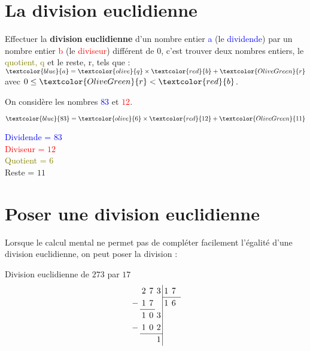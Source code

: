 \begin{pageCours} 

\section{La division euclidienne}

\begin{Def}
Effectuer la \textbf{division euclidienne} d'un nombre entier \textcolor{blue}{a} (le \textcolor{blue}{dividende}) par un nombre entier \textcolor{red}{b} (le \textcolor{red}{diviseur}) différent de 0, c'est trouver deux nombres entiers, le \textcolor{olive}{quotient, q} et le \textcolor{OliveGreen}{reste, r}, tels que : \(\textcolor{blue}{a}=\textcolor{olive}{q}\times\textcolor{red}{b}+\textcolor{OliveGreen}{r}\) avec $0\leq \textcolor{OliveGreen}{r}<\textcolor{red}{b}$.
\end{Def}

\begin{Ex}
On considère les nombres \textcolor{blue}{$83$} et \textcolor{red}{$12$}.

\[\textcolor{blue}{83}=\textcolor{olive}{6}\times\textcolor{red}{12}+\textcolor{OliveGreen}{11}\]

\textcolor{blue}{Dividende = $83$}\\
\textcolor{red}{Diviseur = $12$}\\
\textcolor{olive}{Quotient = $6$}\\
\textcolor{OliveGreen}{Reste = $11$}
\end{Ex}

\section{Poser une division euclidienne}

Lorsque le calcul mental ne permet pas de compléter facilement l'égalité d'une division euclidienne, on peut poser la division :

\begin{Ex}
Division euclidienne de $273$ par $17$
\begin{equation*}
\renewcommand{\arraystretch}{1.2}
\renewcommand{\arraycolsep}{2pt}
  \begin{array}{rrrr|rrr}
 & 2 & 7 & 3 & 1 & 7 \\
\cline{5-7}
 -& 1 & 7 &  & 1 & 6\\
\cline{2-3}
    &1 & 0 & 3 &   &   &  \\
    -& 1 & 0 & 2 &   &   &  \\
    \cline{2-4}
    &&  & 1 &   &   &  \\
  \end{array}
\end{equation*}
\end{Ex} 


\end{pageCours}

